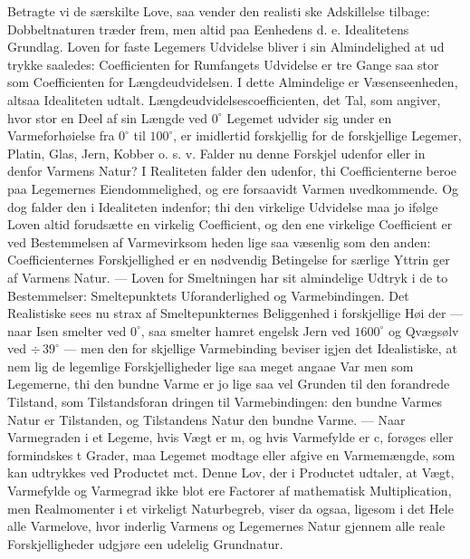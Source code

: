 \documentclass[12pt,a4paper]{book}
\begin{document}
Betragte vi de særskilte Love, saa vender den realisti\-%
ske Adskillelse tilbage: Dobbeltnaturen træder frem, men altid paa
Eenhedens d. e. Idealitetens Grundlag. Loven for faste Legemers
Udvidelse bliver i sin Almindelighed at ud\-%
trykke saaledes: Coefficienten for Rumfangets Udvidelse er tre Gange
saa stor som Coefficienten for Længdeudvidelsen. I dette Almindelige er
Væsenseenheden, altsaa Idealiteten udtalt.
Længdeudvidelsescoefficienten, det Tal, som angiver, hvor stor en Deel
af sin Længde ved $0^{\circ}$ Legemet udvider
sig under en Varmeforhøielse fra $0^{\circ}$ til $100^{\circ}$, er
imidlertid forskjellig for de forskjellige Legemer, Platin, Glas, Jern,
Kobber o. s. v. Falder nu denne Forskjel udenfor eller in\-%
denfor Varmens Natur? I Realiteten falder den udenfor, thi
Coefficienterne beroe paa Legemernes Eiendommelighed, og ere forsaavidt
Varmen uvedkommende. Og dog falder den i Idealiteten indenfor; thi den
virkelige Udvidelse maa jo ifølge Loven altid forudsætte en virkelig
Coefficient, og den ene virkelige Coefficient er ved Bestemmelsen af
Varmevirksom\-%
heden lige saa væsenlig som den anden: Coefficienternes Forskjellighed
er en nødvendig Betingelse for særlige Yttrin\-%
ger af Varmens Natur. --- Loven for Smeltningen har sit almindelige
Udtryk i de to Bestemmelser: Smeltepunktets Uforanderlighed og
Varmebindingen. Det Realistiske sees nu strax af Smeltepunkternes
Beliggenhed i forskjellige Høi\-%
der --- naar Isen smelter ved $0^{\circ}$, saa smelter hamret engelsk
Jern ved $1600^{\circ}$ og Qvægsølv ved $\div\,39^{\circ}$ --- men den
for\-%
skjellige Varmebinding beviser igjen det Idealistiske, at nem\-%
lig de legemlige Forskjelligheder lige saa meget angaae Var\-%
men som Legemerne, thi den bundne Varme er jo lige saa vel Grunden til
den forandrede Tilstand, som Tilstandsforan\-%
dringen til Varmebindingen: den bundne Varmes Natur er Tilstanden, og
Tilstandens Natur den bundne Varme. --- Naar Varmegraden i et Legeme,
hvis Vægt er m, og hvis Varmefylde er c, forøges eller formindskes t
Grader, maa Legemet modtage eller afgive en Varmemængde, som kan
udtrykkes ved Productet mct. Denne Lov, der i Productet udtaler, at
Vægt, Varmefylde og Varmegrad ikke blot ere Factorer af mathematisk
Multiplication, men Realmomenter i et virkeligt Naturbegreb, viser da
ogsaa, ligesom i det Hele alle Varmelove, hvor inderlig Varmens og
Legemernes Natur gjennem alle reale Forskjelligheder udgjøre een
udelelig Grundnatur.
\end{document}
